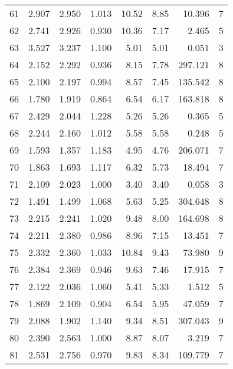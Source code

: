 \begin{tabular}{lrrrrrrr}
61 &     2.907 &      2.950 &      1.013 &   10.52 &     8.85 &   10.396 &        7 \\
62 &     2.741 &      2.926 &      0.930 &   10.36 &     7.17 &    2.465 &        5 \\
63 &     3.527 &      3.237 &      1.100 &    5.01 &     5.01 &    0.051 &        3 \\
64 &     2.152 &      2.292 &      0.936 &    8.15 &     7.78 &  297.121 &        8 \\
65 &     2.100 &      2.197 &      0.994 &    8.57 &     7.45 &  135.542 &        8 \\
66 &     1.780 &      1.919 &      0.864 &    6.54 &     6.17 &  163.818 &        8 \\
67 &     2.429 &      2.044 &      1.228 &    5.26 &     5.26 &    0.365 &        5 \\
68 &     2.244 &      2.160 &      1.012 &    5.58 &     5.58 &    0.248 &        5 \\
69 &     1.593 &      1.357 &      1.183 &    4.95 &     4.76 &  206.071 &        7 \\
70 &     1.863 &      1.693 &      1.117 &    6.32 &     5.73 &   18.494 &        7 \\
71 &     2.109 &      2.023 &      1.000 &    3.40 &     3.40 &    0.058 &        3 \\
72 &     1.491 &      1.499 &      1.068 &    5.63 &     5.25 &  304.648 &        8 \\
73 &     2.215 &      2.241 &      1.020 &    9.48 &     8.00 &  164.698 &        8 \\
74 &     2.211 &      2.380 &      0.986 &    8.96 &     7.15 &   13.451 &        7 \\
75 &     2.332 &      2.360 &      1.033 &   10.84 &     9.43 &   73.980 &        9 \\
76 &     2.384 &      2.369 &      0.946 &    9.63 &     7.46 &   17.915 &        7 \\
77 &     2.122 &      2.036 &      1.060 &    5.41 &     5.33 &    1.512 &        5 \\
78 &     1.869 &      2.109 &      0.904 &    6.54 &     5.95 &   47.059 &        7 \\
79 &     2.088 &      1.902 &      1.140 &    9.34 &     8.51 &  307.043 &        9 \\
80 &     2.390 &      2.563 &      1.000 &    8.87 &     8.07 &    3.219 &        7 \\
81 &     2.531 &      2.756 &      0.970 &    9.83 &     8.34 &  109.779 &        7 \\

\end{tabular}
